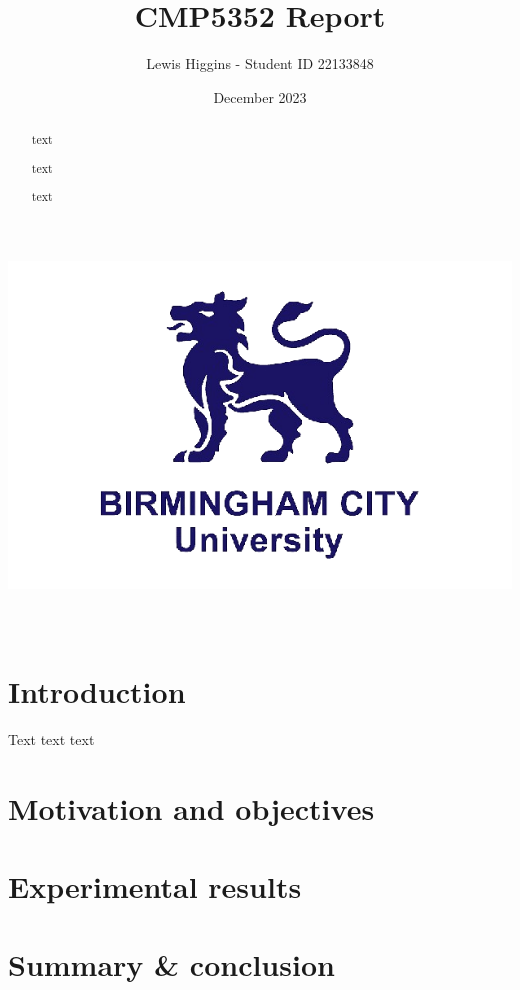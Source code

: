 \documentclass[12pt]{report}
\title{CMP5352 Report}
\author{Lewis Higgins - Student ID 22133848}
\date{December 2023}
\begin{document}
    \pagecolor{yellow}

    \makeatletter
    \begin{titlepage}
        \begin{center}
            \includegraphics[width=0.7\linewidth]{bcu logo}\\[4ex]
            {\large \bfseries  \@title }\\[2ex]
            {\@author}\\[50ex]
            {\large \@date}
        \end{center}
    \end{titlepage}
    \makeatother
    \thispagestyle{empty}
    \newpage

    \pagecolor{white}

    \tableofcontents

    \begin{abstract}
        text

        text

        text

    \end{abstract}


    \chapter*{Introduction}\label{ch:introduction}

    Text text text

    \chapter{Motivation and objectives}\label{ch:sec1}
    

    \chapter{Experimental results}\label{ch:sec2}
    

    \chapter{Summary \& conclusion}\label{ch:sec3}
    
\end{document}
